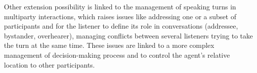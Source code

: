 Other extension possibility is linked to the management of speaking turns in multiparty interactions, which raises issues like addressing one or a subset of participants and for the listener to define its role in conversations (addressee, bystander, overhearer), managing conflicts between several listeners trying to take the turn at the same time. These issues are linked to a more complex management of decision-making process and to control the agent's relative location to other participants.



% 